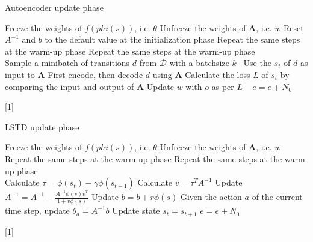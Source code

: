 \documentclass[a4paper,12pt,oneside]{article}
\numberwithin{equation}{section}
\begin{document}
    \clearpage
    \begin{algorithm}
    \caption{Autoencoder update phase}
        \begin{algorithmic}[1]
            \State Freeze the weights of \(f(phi(s))\), i.e. $\theta$
            \State Unfreeze the weights of $\mathbf{A}$, i.e. \(w\)
            \State Reset \(A^{-1}\) and \(b\) to the default value at the initialization phase 
            \State Repeat the same steps at the warm-up phase
                \State Repeat the same steps at the warm-up phase
                \\
                \State Sample a minibatch of transitions \(d\) from $\mathcal{D}$ with a batchsize \(k\) \
                \State Use the \(s_t\) of \(d\) as input to $\mathbf{A}$
                \State First encode, then decode \(d\) using $\mathbf{A}$
                \State Calculate the loss \(L\) of \(s_t\) by comparing the input and output of $\mathbf{A}$
                \State Update \(w\) with \(o\) as per \(L\)
                \
            \EndFor
        \EndFor
        \State $e=e+N_0$
        \end{algorithmic}[1]
    \end{algorithm}

    \clearpage
    \begin{algorithm}
    \caption{LSTD update phase}
        \begin{algorithmic}[1]
            \State Freeze the weights of \(f(phi(s))\), i.e. $\theta$
            \State Unfreeze the weights of $\mathbf{A}$, i.e. \(w\)
        \For {\(episode\) \(e_0 = 1\) to \(N_0\)}
            \State Repeat the same steps at the warm-up phase
                \State Repeat the same steps at the warm-up phase
                \\
                \State Calculate $\tau = \phi(s_t) - \gamma \phi(s_{t+1})$
                \State Calculate $v = \tau^{T} A^{-1}$
                \State Update $A^{-1} = A^{-1} - \frac{A^{-1} \phi(s) v^{T}}{1 + v \phi(s)}$
                \State Update $b = b + r \phi(s)$
                \State Given the action $a$ of the current time step, update $\theta_a = A^{-1} b $
                \State Update state $s_t=s_{t+1}$
            \EndFor
        \EndFor
        \State $e=e+N_0$
        \end{algorithmic}[1]    
    \end{algorithm}
\end{document}
